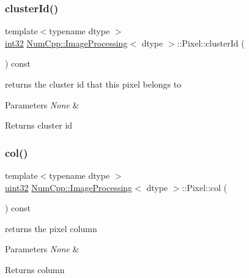 \subsubsection{\texorpdfstring{cluster\+Id()}{clusterId()}}
{\footnotesize\ttfamily template$<$typename dtype $>$ \\
\mbox{\hyperlink{namespace_num_cpp_acf3eb1592f8b248ff0a236634864633c}{int32}} \mbox{\hyperlink{class_num_cpp_1_1_image_processing}{Num\+Cpp\+::\+Image\+Processing}}$<$ dtype $>$\+::Pixel\+::cluster\+Id (\begin{DoxyParamCaption}{ }\end{DoxyParamCaption}) const\hspace{0.3cm}{\ttfamily [inline]}}

returns the cluster id that this pixel belongs to


\begin{DoxyParams}{Parameters}
{\em None} & \\
\hline
\end{DoxyParams}
\begin{DoxyReturn}{Returns}
cluster id 
\end{DoxyReturn}
\mbox{\label{class_num_cpp_1_1_image_processing_1_1_pixel_a7fca43616140f9578d4cadc6983f91cf}} 
\subsubsection{\texorpdfstring{col()}{col()}}
{\footnotesize\ttfamily template$<$typename dtype $>$ \\
\mbox{\hyperlink{namespace_num_cpp_a36f388e948380413c63011cab9b7fbd5}{uint32}} \mbox{\hyperlink{class_num_cpp_1_1_image_processing}{Num\+Cpp\+::\+Image\+Processing}}$<$ dtype $>$\+::Pixel\+::col (\begin{DoxyParamCaption}{ }\end{DoxyParamCaption}) const\hspace{0.3cm}{\ttfamily [inline]}}

returns the pixel column


\begin{DoxyParams}{Parameters}
{\em None} & \\
\hline
\end{DoxyParams}
\begin{DoxyReturn}{Returns}
column 
\end{DoxyReturn}
\mbox{\label{class_num_cpp_1_1_image_processing_1_1_pixel_ab5c4e0bd7121e3a51ccf3ae5e7a9f621}} 
